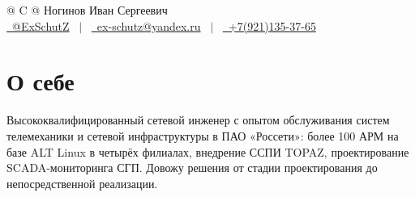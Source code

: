\documentclass[a4paper,12pt]{article}
\begin{document}
\pagestyle{empty} 



\begin{tabularx}{\linewidth}{@{} C @{}}
\Huge{Ногинов Иван Сергеевич} \\[7.5pt]
\href{https://t.me/ExSchutZ}{\raisebox{-0.05\height}\faTelegram\ @ExSchutZ} \ $|$ \ 
\href{mailto:ex-schutz@yandex.ru}{\raisebox{-0.05\height}\faEnvelope \ ex-schutz@yandex.ru} \ $|$ \ 
\href{tel:+79211353765}{\raisebox{-0.05\height}\faMobile \ +7(921)135-37-65} \\
\end{tabularx}


\section{О себе}
Высококвалифицированный сетевой инженер с опытом обслуживания систем телемеханики и сетевой инфраструктуры в ПАО «Россети»: более 100 АРМ на базе ALT Linux в четырёх филиалах, внедрение ССПИ TOPAZ, проектирование SCADA-мониторинга СГП. Довожу решения от стадии проектирования до непосредственной реализации.

\end{document}
